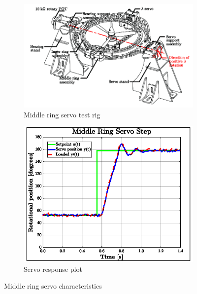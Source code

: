 \begin{figure}[hbtp]
\vspace{-4pt}
\centering
\begin{subfigure}{0.88\textwidth}
\centering
\includegraphics[width=\textwidth]{figs/servo-middle}
\vspace{-12pt}
\caption{Middle ring servo test rig}
\label{fig:servo-middle}
\vspace{3pt}
\end{subfigure}
\par
\begin{subfigure}{0.49\textwidth}
\centering
\includegraphics[width=\textwidth]{graphs/servo-step-middle}
\vspace{-10pt}
\caption{Servo response plot}
\label{fig:servo-step-middle}
\end{subfigure}
\vspace{-8pt}
\caption{Middle ring servo characteristics}
\label{fig:servo-middle-character}
\vspace{-18pt}
\end{figure}
